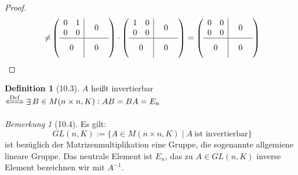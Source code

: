 \documentclass[a4paper]{scrartcl}
\DeclareMathOperator{\Exists}{\exists}
\theoremstyle{definition}
\newtheorem{defn}{Definition}
\theoremstyle{plain}
\theoremstyle{plain}
\theoremstyle{remark}
\newtheorem{remark}{Bemerkung}
\theoremstyle{remark}
\theoremstyle{remark}
\theoremstyle{remark}
\theoremstyle{remark}
\begin{document}
\begin{proof}
\begin{align*}
\neq&
\sbox0{$\begin{matrix} 1 & 0 \\ 0 & 0 \end{matrix}$}%
\sbox1{$\begin{matrix} 0 & 1 \\ 0 & 0 \end{matrix}$}%
\sbox2{$\begin{matrix} 0 & 0 \\ 0 & 0 \end{matrix}$}%
\left(
\begin{array}{c|c}
\usebox{1}&\makebox[\wd1]{$0$} \\
\hline
\vphantom{\usebox{1}}\makebox[\wd1]{$0$}&\makebox[\wd1]{$0$}
\end{array}
\right)
\cdot
\left(
\begin{array}{c|c}
\usebox{0}&\makebox[\wd0]{$0$} \\
\hline
\vphantom{\usebox{0}}\makebox[\wd0]{$0$}&\makebox[\wd0]{$0$}
\end{array}
\right)
=
\left(
\begin{array}{c|c}
\usebox{2}&\makebox[\wd1]{$0$} \\
\hline
\vphantom{\usebox{1}}\makebox[\wd1]{$0$}&\makebox[\wd1]{$0$}
\end{array}
\right) \\
\end{align*}
\end{proof}
\begin{defn}[10.3]
$A$ heißt invertierbar $\xLeftrightarrow{\text{Def}} \Exists B\in M(n\times n, K): AB = BA = E_n$
\end{defn}
\begin{remark}[10.4]
Es gilt:
\[GL(n, K) := \{A\in M(n\times n, K) \mid A ~\text{ist invertierbar}\}\]
ist bezüglich der Matrizenmultiplikation eine Gruppe, die sogenannte allgemiene lineare Gruppe.
Das neutrale Element ist $E_n$, das zu $A\in GL(n,K)$ inverse Element bezeichnen wir mit $A^{-1}$.
\end{remark}
\end{document}
